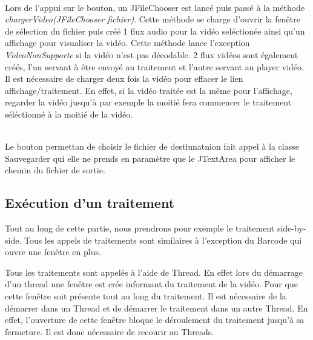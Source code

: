 \documentclass[10pt,a4paper]{article}
\begin{document}

~~\\

Lors de l'appui sur le bouton, un JFileChooser est lancé puis passé à la méthode \textit{chargerVideo(JFileChooser fichier)}.
Cette méthode se charge d'ouvrir la fenêtre de sélection du fichier puis créé 1 flux audio pour la vidéo seléctionée ainsi qu'un affichage pour visualiser la vidéo. Cette méthode lance l'exception
\textit{VideoNonSupporte} si la vidéo n'est pas décodable.
2 flux vidéos sont également créés, l'un servant à être envoyé au traitement et l'autre servant au player vidéo. Il est
nécessaire de charger deux fois la vidéo pour effacer le lien affichage/traitement. En effet, si la vidéo traitée est la même pour l'affichage, regarder la vidéo jusqu'à par exemple la moitié fera commencer
le traitement séléctionné à la moitié de la vidéo.


~~\\

Le bouton permettan de choisir le fichier de destiunatnion fait appel à la classe Sauvegarder qui elle ne prends en paramètre que le JTextArea pour afficher le chemin du fichier de sortie.

\subsection{Exécution d'un traitement}

Tout au long de cette partie, nous prendrons pour exemple le traitement side-by-side. Tous les appels de traitements sont similaires à l'exception du Barcode qui ouvre une fenêtre en plus.

Tous les traitements sont appelés à l'aide de Thread. En effet lors du démarrage d'un thread une fenêtre est crée informant du traitement de la vidéo. Pour que cette fenêtre soit présente
tout au long du traitement. Il est nécessaire de la démarrer dans un Thread et de démarrer le traitement dans un autre Thread. En effet, l'ouverture de cette fenêtre bloque le déroulement du traitement
jusqu'à sa fermeture. Il est donc nécessaire de recourir au Threads.
\end{document}

